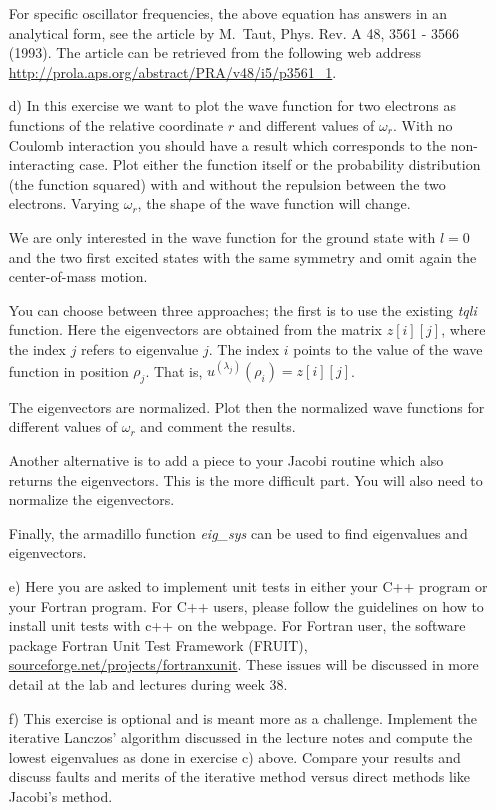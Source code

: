 \documentclass[11pt,a4wide]{article}
\begin{document}
\begin{enumerate}
For specific oscillator frequencies, the above equation has answers in an analytical form,
see the article by M.~Taut, Phys. Rev. A 48, 3561 - 3566 (1993).
The article can be retrieved from the following web address
\url{http://prola.aps.org/abstract/PRA/v48/i5/p3561_1}.



\item[d)] 
In this exercise we want to plot the wave function 
for two electrons as functions of the relative coordinate $r$ and different
values of $\omega_r$.  With no Coulomb interaction you should have a result which corresponds to the non-interacting case. 
Plot either the function itself or the probability distribution (the function squared) with and without the repulsion between the two electrons.
Varying $\omega_r$, the shape of the wave function
will change.  

We are only interested in the wave function for the ground state with $l=0$ and the two first excited states with the same symmetry and
omit again the  center-of-mass motion.

You can choose between three approaches; the first is to use the existing
{\em tqli} function. Here the eigenvectors are obtained from the matrix
$z[i][j]$, where the index $j$ refers to eigenvalue $j$. The index $i$
points to the value of the wave function in position $\rho_j$.  
That is,  $u^{(\lambda_j)}(\rho_i)=z[i][j]$.   

The eigenvectors are normalized. 
Plot then the normalized wave functions for different 
values of $\omega_r$ and comment the results.

Another alternative is to add a piece to your Jacobi routine which also
returns the eigenvectors. This is the more difficult part.
You will also need to normalize the eigenvectors.

Finally, the armadillo function {\em eig\_sys} can be used to find eigenvalues and eigenvectors.



\item[e)]  
Here you are asked to implement unit tests in either your C++ program or your Fortran program. For C++ users, please follow the guidelines on how to install
unit tests with c++ on the webpage. For Fortran user, the software package Fortran Unit Test Framework (FRUIT), \url{sourceforge.net/projects/fortranxunit}. These issues will be discussed in more detail at the lab and lectures during week 38. 

\item[f)]  This exercise is optional and is meant more as a challenge. 
Implement the iterative Lanczos' algorithm discussed in the lecture notes and compute the lowest eigenvalues 
as done in exercise c) above. Compare your results and discuss faults and merits of the iterative method versus
direct methods like Jacobi's method. 
\end{enumerate}
\end{document}
